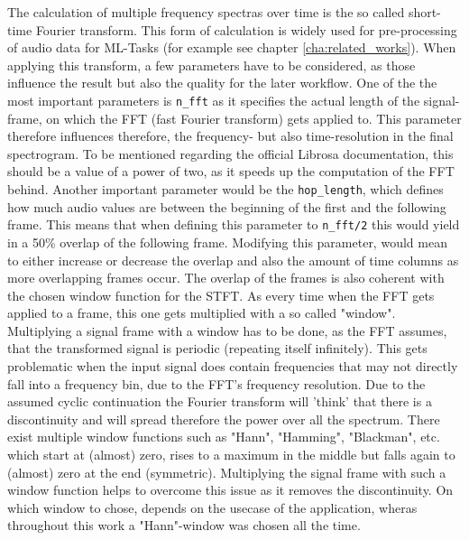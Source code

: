 The calculation of multiple frequency spectras over time is the so called short-time Fourier transform. This form of calculation is widely used for pre-processing of audio data for ML-Tasks (for example see chapter \ref{cha:related_works}). When applying this transform, a few parameters have to be considered, as those influence the result but also the quality for the later workflow. One of the the most important parameters is \texttt{n\_fft} as it specifies the actual length of the signal-frame, on which the FFT (fast Fourier transform) gets applied to. This parameter therefore influences therefore, the frequency- but also time-resolution in the final spectrogram. To be mentioned regarding the official Librosa documentation, this should be a value of a power of two, as it speeds up the computation of the FFT behind. Another important parameter would be the \texttt{hop\_length}, which defines how much audio values are between the beginning of the first and the following frame. This means that when defining this parameter to \texttt{n\_fft/2} this would yield in a 50\% overlap of the following frame. Modifying this parameter, would mean to either increase or decrease the overlap and also the amount of time columns as more overlapping frames occur. The overlap of the frames is also coherent with the chosen window function for the STFT. As every time when the FFT gets applied to a frame, this one gets multiplied with a so called "window". Multiplying a signal frame with a window has to be done, as the FFT assumes, that the transformed signal is periodic (repeating itself infinitely). \cite{heinzel2002spectrum} This gets problematic when the input signal does contain frequencies that may not directly fall into a frequency bin, due to the FFT's frequency resolution. Due to the assumed cyclic continuation the Fourier transform will 'think' that there is a discontinuity and will spread therefore the power over all the spectrum. There exist multiple window functions such as "Hann", "Hamming", "Blackman", etc. which start at (almost) zero, rises to a maximum in the middle but falls again to (almost) zero at the end (symmetric). Multiplying the signal frame with such a window function helps to overcome this issue as it removes the discontinuity. On which window to chose, depends on the usecase of the application, wheras throughout this work a "Hann"-window was chosen all the time. 


